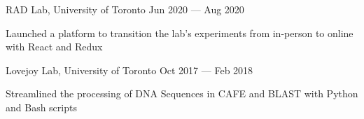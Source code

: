 \begin{cventries}
  \cventry
    {}
    {RAD Lab, University of Toronto}
    {}
    {Jun 2020 --- Aug 2020}
    {}
    {
      \begin{cvitems}
        \item {Launched a platform to transition the lab's experiments from in-person to online with React and Redux}
      \end{cvitems}
    }
  \cventry
    {}
    {Lovejoy Lab, University of Toronto}
    {}
    {Oct 2017 --- Feb 2018}
    {}
    {
      \begin{cvitems}
        \item {Streamlined the processing of DNA Sequences in CAFE and BLAST with Python and Bash scripts}
      \end{cvitems}
    }
\end{cventries}